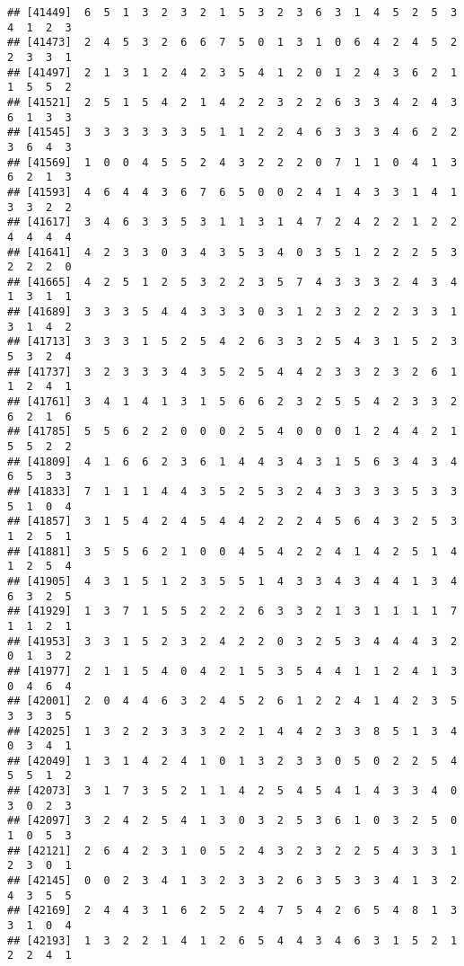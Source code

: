 \documentclass[
]{article}
\begin{document}
\begin{verbatim}
## [41449]  6  5  1  3  2  3  2  1  5  3  2  3  6  3  1  4  5  2  5  3  4  1  2  3
## [41473]  2  4  5  3  2  6  6  7  5  0  1  3  1  0  6  4  2  4  5  2  2  3  3  1
## [41497]  2  1  3  1  2  4  2  3  5  4  1  2  0  1  2  4  3  6  2  1  1  5  5  2
## [41521]  2  5  1  5  4  2  1  4  2  2  3  2  2  6  3  3  4  2  4  3  6  1  3  3
## [41545]  3  3  3  3  3  3  5  1  1  2  2  4  6  3  3  3  4  6  2  2  3  6  4  3
## [41569]  1  0  0  4  5  5  2  4  3  2  2  2  0  7  1  1  0  4  1  3  6  2  1  3
## [41593]  4  6  4  4  3  6  7  6  5  0  0  2  4  1  4  3  3  1  4  1  3  3  2  2
## [41617]  3  4  6  3  3  5  3  1  1  3  1  4  7  2  4  2  2  1  2  2  4  4  4  4
## [41641]  4  2  3  3  0  3  4  3  5  3  4  0  3  5  1  2  2  2  5  3  2  2  2  0
## [41665]  4  2  5  1  2  5  3  2  2  3  5  7  4  3  3  3  2  4  3  4  1  3  1  1
## [41689]  3  3  3  5  4  4  3  3  3  0  3  1  2  3  2  2  2  3  3  1  3  1  4  2
## [41713]  3  3  3  1  5  2  5  4  2  6  3  3  2  5  4  3  1  5  2  3  5  3  2  4
## [41737]  3  2  3  3  3  4  3  5  2  5  4  4  2  3  3  2  3  2  6  1  1  2  4  1
## [41761]  3  4  1  4  1  3  1  5  6  6  2  3  2  5  5  4  2  3  3  2  6  2  1  6
## [41785]  5  5  6  2  2  0  0  0  2  5  4  0  0  0  1  2  4  4  2  1  5  5  2  2
## [41809]  4  1  6  6  2  3  6  1  4  4  3  4  3  1  5  6  3  4  3  4  6  5  3  3
## [41833]  7  1  1  1  4  4  3  5  2  5  3  2  4  3  3  3  3  5  3  3  5  1  0  4
## [41857]  3  1  5  4  2  4  5  4  4  2  2  2  4  5  6  4  3  2  5  3  1  2  5  1
## [41881]  3  5  5  6  2  1  0  0  4  5  4  2  2  4  1  4  2  5  1  4  1  2  5  4
## [41905]  4  3  1  5  1  2  3  5  5  1  4  3  3  4  3  4  4  1  3  4  6  3  2  5
## [41929]  1  3  7  1  5  5  2  2  2  6  3  3  2  1  3  1  1  1  1  7  1  1  2  1
## [41953]  3  3  1  5  2  3  2  4  2  2  0  3  2  5  3  4  4  4  3  2  0  1  3  2
## [41977]  2  1  1  5  4  0  4  2  1  5  3  5  4  4  1  1  2  4  1  3  0  4  6  4
## [42001]  2  0  4  4  6  3  2  4  5  2  6  1  2  2  4  1  4  2  3  5  3  3  3  5
## [42025]  1  3  2  2  3  3  3  2  2  1  4  4  2  3  3  8  5  1  3  4  0  3  4  1
## [42049]  1  3  1  4  2  4  1  0  1  3  2  3  3  0  5  0  2  2  5  4  5  5  1  2
## [42073]  3  1  7  3  5  2  1  1  4  2  5  4  5  4  1  4  3  3  4  0  3  0  2  3
## [42097]  3  2  4  2  5  4  1  3  0  3  2  5  3  6  1  0  3  2  5  0  1  0  5  3
## [42121]  2  6  4  2  3  1  0  5  2  4  3  2  3  2  2  5  4  3  3  1  2  3  0  1
## [42145]  0  0  2  3  4  1  3  2  3  3  2  6  3  5  3  3  4  1  3  2  4  3  5  5
## [42169]  2  4  4  3  1  6  2  5  2  4  7  5  4  2  6  5  4  8  1  3  3  1  0  4
## [42193]  1  3  2  2  1  4  1  2  6  5  4  4  3  4  6  3  1  5  2  1  2  2  4  1

\end{verbatim}
\end{document}
